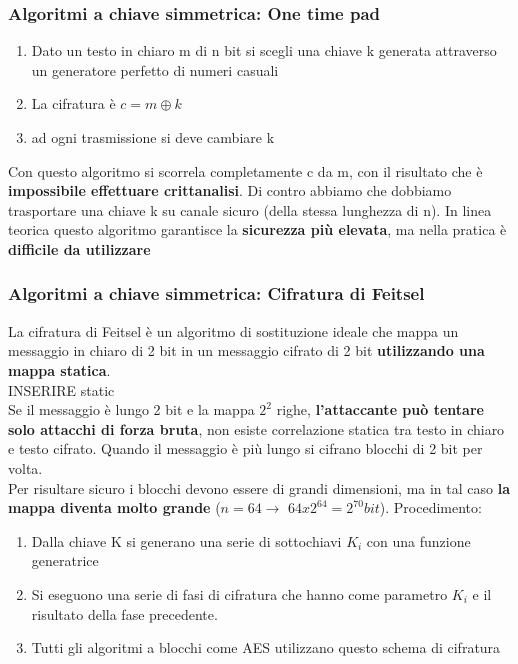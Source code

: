 \documentclass[12pt]{article}
\begin{document}
 			\subsubsection{Algoritmi a chiave simmetrica: One time pad}
 				\begin{enumerate}
 					\item Dato un testo in chiaro m di n bit si scegli una chiave k generata attraverso un generatore perfetto di numeri casuali
 					\item La cifratura è $c=m\oplus k$
	 				\item ad ogni trasmissione si deve cambiare k
 				\end{enumerate}
 				Con questo algoritmo si scorrela completamente c da m, con il risultato che è \textbf{impossibile effettuare crittanalisi}. Di contro abbiamo che dobbiamo trasportare una chiave k su canale sicuro (della stessa lunghezza di n). In linea teorica questo algoritmo garantisce la \textbf{sicurezza più elevata}, ma nella pratica è \textbf{difficile da utilizzare}
 			
 			\subsubsection{Algoritmi a chiave simmetrica: Cifratura di Feitsel}
 				La cifratura di Feitsel è un algoritmo di sostituzione ideale che mappa un messaggio in chiaro di 2 bit in un messaggio cifrato di 2 bit \textbf{utilizzando una mappa statica}.\\
 			
 				INSERIRE static\\
 			
 				Se il messaggio è lungo 2 bit e la mappa $2^{2}$ righe, \textbf{l'attaccante può tentare solo attacchi di forza bruta}, non esiste correlazione statica tra testo in chiaro e testo cifrato. Quando il messaggio è più lungo si cifrano blocchi di 2 bit per volta.\\
 				Per risultare sicuro i blocchi devono essere di grandi dimensioni, ma in tal caso \textbf{la mappa diventa molto grande} ($n=64 \rightarrow$ $64x2^{64} = 2^{70} bit$). Procedimento:
 				\begin{enumerate}
 					\item Dalla chiave K si generano una serie di sottochiavi $K_{i}$ con una funzione generatrice
 					\item Si eseguono una serie di fasi di cifratura che hanno come parametro $K_{i}$ e il risultato della fase precedente.
 					\item Tutti gli algoritmi a blocchi come AES utilizzano questo schema di cifratura
 				\end{enumerate}
			
\end{document}
